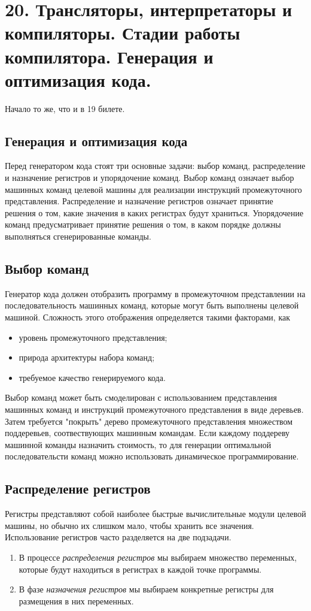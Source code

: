 \documentclass[a4paper,12pt]{article}
\begin{document}
\section{20. Трансляторы, интерпретаторы и компиляторы. Стадии работы компилятора. Генерация и оптимизация кода.}

Начало то же, что и в 19 билете.

\subsection{Генерация и оптимизация кода}

Перед генератором кода стоят три основные задачи: выбор команд, распределение и назначение регистров и упорядочение команд. Выбор команд означает выбор машинных команд целевой машины для реализации инструкций промежуточного представления. Распределение и назначение регистров означает принятие решения о том, какие значения в каких регистрах будут храниться. Упорядочение команд предусматривает принятие решения о том, в каком порядке должны выполняться сгенерированные команды.

\subsection{Выбор команд}

Генератор кода должен отобразить программу в промежуточном представлении на последовательность машинных команд, которые могут быть выполнены целевой машиной. Сложность этого отображения определяется такими факторами, как
\begin{itemize}
\item уровень промежуточного представления;
\item природа архитектуры набора команд;
\item требуемое качество генерируемого кода.
\end{itemize}
Выбор команд может быть смоделирован с использованием представления машинных команд и инструкций промежуточного представления в виде деревьев. Затем требуется "покрыть" дерево промежуточного представления множеством поддеревьев, соотвествующих машинным командам. Если каждому поддереву машинной команды назначить стоимость, то для генерации оптимальной последовательсти команд можно использовать динамическое программирование.

\subsection{Распределение регистров}
Регистры представляют собой наиболее быстрые вычислительные модули целевой машины, но обычно их слишком мало, чтобы хранить все значения. Использование регистров часто разделяется на две подзадачи.
\begin{enumerate}
\item В процессе \textit{распределения регистров} мы выбираем множество переменных, которые будут находиться в регистрах в каждой точке программы.
\item В фазе \textit{назначения регистров} мы выбираем конкретные регистры для размещения в них переменных.
\end{enumerate}
\end{document}
